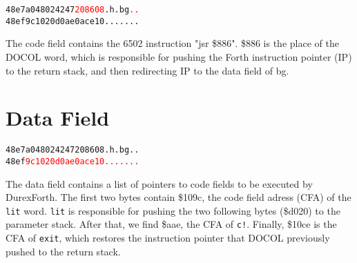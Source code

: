 \begin{alltt}
48e7  a0 48 02 42 47 \textcolor{red}{20 86 08} .h.bg \textcolor{red}{..}
48ef  9c 10 20 d0 ae 0a ce 10 .. .....
\end{alltt}

The code field contains the 6502 instruction "jsr \$886". \$886 is the place of the DOCOL word, which is responsible for pushing the Forth instruction pointer (IP) to the return stack, and then redirecting IP to the data field of bg.

\section{Data Field}

\begin{alltt}
48e7  a0 48 02 42 47 20 86 08 .h.bg ..
48ef  \textcolor{red}{9c 10 20 d0 ae 0a ce 10 .. .....}
\end{alltt}

The data field contains a list of pointers to code fields to be executed by DurexForth. The first two bytes contain \$109c, the code field adress (CFA) of the \texttt{lit} word. \texttt{lit} is responsible for pushing the two following bytes (\$d020) to the parameter stack. After that, we find \$aae, the CFA of \texttt{c!}. Finally, \$10ce is the CFA of \texttt{exit}, which restores the instruction pointer that DOCOL previously pushed to the return stack.
